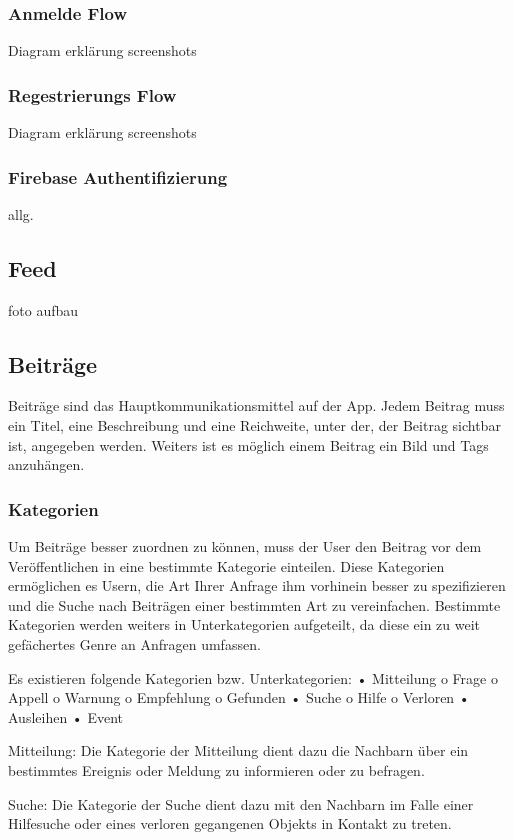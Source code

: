 \subsubsection{Anmelde Flow}
Diagram
erklärung
screenshots
\subsubsection{Regestrierungs Flow}

Diagram
erklärung
screenshots


\subsubsection{Firebase Authentifizierung}
allg.


\subsection{Feed}
foto
aufbau

\subsection{Beiträge}
Beiträge sind das Hauptkommunikationsmittel auf der App. Jedem Beitrag muss ein Titel, eine Beschreibung und eine Reichweite, unter der, der Beitrag sichtbar ist, angegeben werden. Weiters ist es möglich einem Beitrag ein Bild und Tags anzuhängen.

\subsubsection{Kategorien}
Um Beiträge besser zuordnen zu können, muss der User den Beitrag vor dem Veröffentlichen in eine bestimmte Kategorie einteilen. Diese Kategorien ermöglichen es Usern, die Art Ihrer Anfrage ihm vorhinein besser zu spezifizieren und die Suche nach Beiträgen einer bestimmten Art zu vereinfachen. Bestimmte Kategorien werden weiters in Unterkategorien aufgeteilt, da diese ein zu weit gefächertes Genre an Anfragen umfassen.

Es existieren folgende Kategorien bzw. Unterkategorien:
•	Mitteilung
o	Frage
o	Appell
o	Warnung
o	Empfehlung
o	Gefunden
•	Suche
o	Hilfe
o	Verloren
•	Ausleihen
•	Event

Mitteilung:
Die Kategorie der Mitteilung dient dazu die Nachbarn über ein bestimmtes Ereignis oder Meldung zu informieren oder zu befragen.

Suche:
Die Kategorie der Suche dient dazu mit den Nachbarn im Falle einer Hilfesuche oder eines verloren gegangenen Objekts in Kontakt zu treten.

